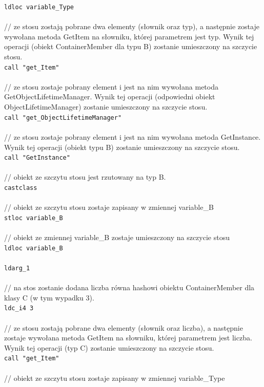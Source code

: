 \documentclass[12pt]{article}
\begin{document}
\texttt{ldloc variable\_Type}\\
\\
// ze stosu zostają pobrane dwa elementy (słownik oraz typ), a następnie zostaje wywołana metoda GetItem na słowniku, której parametrem jest typ. Wynik tej operacji (obiekt ContainerMember dla typu B) zostanie umieszczony na szczycie stosu.\\
\texttt{call "get\_Item" }\\
\\
// ze stosu zostaje pobrany element i jest na nim wywołana metoda GetObjectLifetimeManager. Wynik tej operacji (odpowiedni obiekt ObjectLifetimeManager) zostanie umieszczony na szczycie stosu.\\
\texttt{call "get\_ObjectLifetimeManager"}\\
\\
// ze stosu zostaje pobrany element i jest na nim wywołana metoda GetInstance. Wynik tej operacji (obiekt typu B) zostanie umieszczony na szczycie stosu.\\
\texttt{call "GetInstance"}\\
\\
// obiekt ze szczytu stosu jest rzutowany na typ B.\\
\texttt{castclass}\\
\\
// obiekt ze szczytu stosu zostaje zapisany w zmiennej variable\_B\\
\texttt{stloc variable\_B}\\
\\
// obiekt ze zmiennej variable\_B zostaje umieszczony na szczycie stosu\\
\texttt{ldloc variable\_B}\\
\\
\texttt{ldarg\_1}\\
\\
// na stos zostanie dodana liczba równa hashowi obiektu ContainerMember dla klasy C (w tym wypadku 3).\\
\texttt{ldc\_i4 3}\\
\\
// ze stosu zostają pobrane dwa elementy (słownik oraz liczba), a następnie zostaje wywołana metoda GetItem na słowniku, której parametrem jest liczba. Wynik tej operacji (typ C) zostanie umieszczony na szczycie stosu.\\
\texttt{call "get\_Item"}\\
\\
// obiekt ze szczytu stosu zostaje zapisany w zmiennej variable\_Type\\
\end{document}

